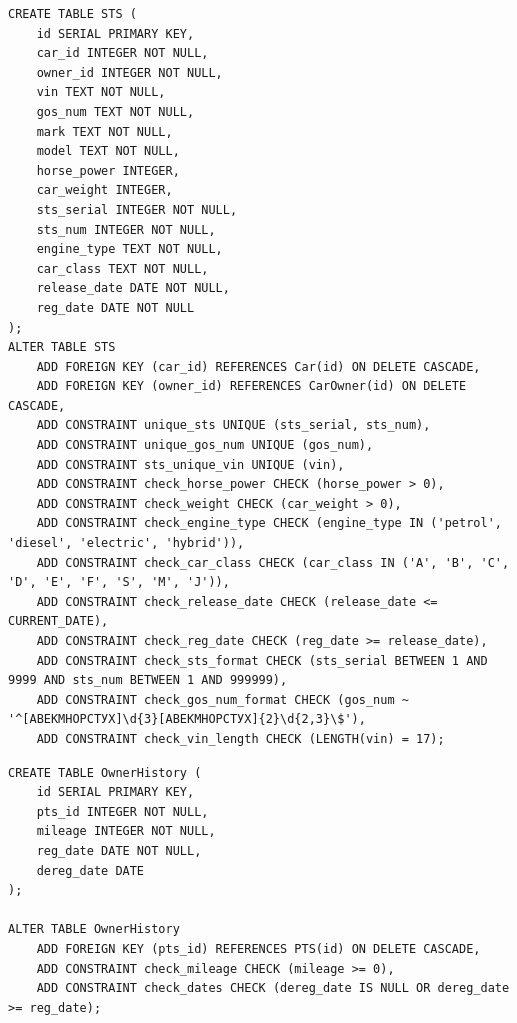 \begin{center}
\captionsetup{justification=raggedright,singlelinecheck=off}
\begin{lstlisting}[label=tablecreate-5, caption=Создание таблицы STS]
CREATE TABLE STS (
    id SERIAL PRIMARY KEY,
    car_id INTEGER NOT NULL,
    owner_id INTEGER NOT NULL,
    vin TEXT NOT NULL,
    gos_num TEXT NOT NULL,
    mark TEXT NOT NULL,
    model TEXT NOT NULL,
    horse_power INTEGER,
    car_weight INTEGER,
    sts_serial INTEGER NOT NULL,
    sts_num INTEGER NOT NULL,
    engine_type TEXT NOT NULL,
    car_class TEXT NOT NULL,
    release_date DATE NOT NULL,
    reg_date DATE NOT NULL
);
ALTER TABLE STS
    ADD FOREIGN KEY (car_id) REFERENCES Car(id) ON DELETE CASCADE,
    ADD FOREIGN KEY (owner_id) REFERENCES CarOwner(id) ON DELETE CASCADE,
    ADD CONSTRAINT unique_sts UNIQUE (sts_serial, sts_num),
    ADD CONSTRAINT unique_gos_num UNIQUE (gos_num),
    ADD CONSTRAINT sts_unique_vin UNIQUE (vin),
    ADD CONSTRAINT check_horse_power CHECK (horse_power > 0),
    ADD CONSTRAINT check_weight CHECK (car_weight > 0),
    ADD CONSTRAINT check_engine_type CHECK (engine_type IN ('petrol', 'diesel', 'electric', 'hybrid')),
    ADD CONSTRAINT check_car_class CHECK (car_class IN ('A', 'B', 'C', 'D', 'E', 'F', 'S', 'M', 'J')),
    ADD CONSTRAINT check_release_date CHECK (release_date <= CURRENT_DATE),
    ADD CONSTRAINT check_reg_date CHECK (reg_date >= release_date),
    ADD CONSTRAINT check_sts_format CHECK (sts_serial BETWEEN 1 AND 9999 AND sts_num BETWEEN 1 AND 999999),
    ADD CONSTRAINT check_gos_num_format CHECK (gos_num ~ '^[АВЕКМНОРСТУХ]\d{3}[АВЕКМНОРСТУХ]{2}\d{2,3}\$'),
    ADD CONSTRAINT check_vin_length CHECK (LENGTH(vin) = 17);
\end{lstlisting}
\end{center}

\begin{center}
\captionsetup{justification=raggedright,singlelinecheck=off}
\begin{lstlisting}[label=tablecreate-6, caption=Создание таблицы OwnerHistory]
CREATE TABLE OwnerHistory (
    id SERIAL PRIMARY KEY,
    pts_id INTEGER NOT NULL,
    mileage INTEGER NOT NULL,
    reg_date DATE NOT NULL,
    dereg_date DATE
);

ALTER TABLE OwnerHistory
    ADD FOREIGN KEY (pts_id) REFERENCES PTS(id) ON DELETE CASCADE,
    ADD CONSTRAINT check_mileage CHECK (mileage >= 0),
    ADD CONSTRAINT check_dates CHECK (dereg_date IS NULL OR dereg_date >= reg_date);
\end{lstlisting}
\end{center}

